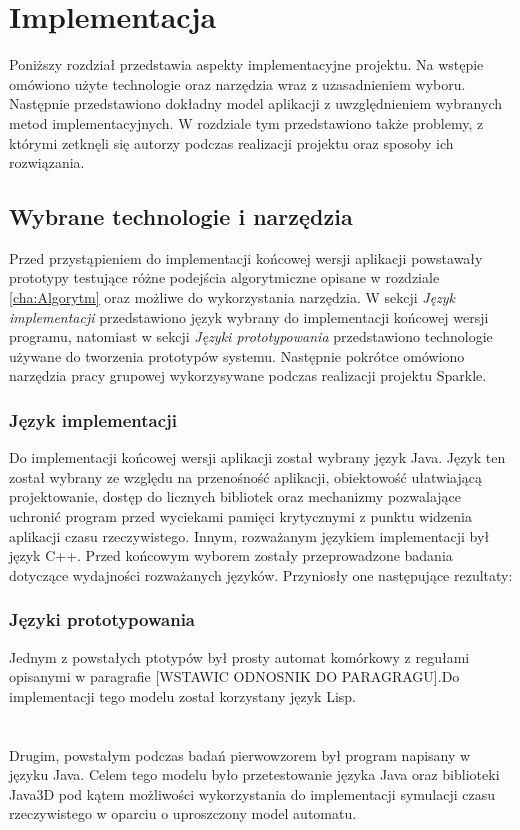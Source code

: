 ﻿\chapter {Implementacja}
\label{cha:implementacja}
Poniższy rozdział przedstawia aspekty implementacyjne projektu. Na wstępie omówiono użyte technologie oraz narzędzia wraz z uzasadnieniem wyboru. Następnie przedstawiono dokładny model aplikacji z uwzględnieniem wybranych metod implementacyjnych. 
W rozdziale tym przedstawiono także problemy, z którymi zetknęli się autorzy podczas realizacji projektu oraz sposoby ich rozwiązania.
\section {Wybrane technologie i narzędzia}
Przed przystąpieniem do implementacji końcowej wersji aplikacji powstawały prototypy testujące różne podejścia algorytmiczne opisane w rozdziale \ref{cha:Algorytm} oraz możliwe do wykorzystania narzędzia. W sekcji \textit{Język implementacji} przedstawiono język wybrany do implementacji końcowej wersji programu, natomiast w sekcji \textit{Języki prototypowania} przedstawiono technologie używane do tworzenia prototypów systemu. Następnie pokrótce omówiono narzędzia pracy grupowej wykorzysywane podczas realizacji projektu Sparkle.
\subsection{Język implementacji}
Do implementacji końcowej wersji aplikacji został wybrany język Java.
Język ten został wybrany ze względu na przenośność aplikacji, obiektowość ułatwiającą projektowanie, dostęp do licznych 
bibliotek oraz mechanizmy pozwalające uchronić program przed wyciekami pamięci krytycznymi z punktu widzenia aplikacji czasu rzeczywistego. Innym, rozważanym językiem implementacji był język C++. Przed końcowym wyborem zostały przeprowadzone badania dotyczące wydajności rozważanych języków. Przyniosły one następujące rezultaty:
\begin{itemize}

\end{itemize}

\subsection{Języki prototypowania}
Jednym z powstałych ptotypów był prosty automat komórkowy z regułami opisanymi w paragrafie [WSTAWIC ODNOSNIK DO PARAGRAGU].Do implementacji tego modelu został korzystany język Lisp.
\\\\
[TUTAJ WSTAWIC ZALETY LISPA DO PROTOTYPOWANIA - WYMYSLISZ COS PRAWDA :>?]
\\
Drugim, powstałym podczas badań pierwowzorem był program napisany w języku Java.
Celem tego modelu było przetestowanie języka Java oraz biblioteki Java3D pod kątem możliwości wykorzystania do implementacji symulacji czasu rzeczywistego w oparciu o uproszczony model automatu. 

